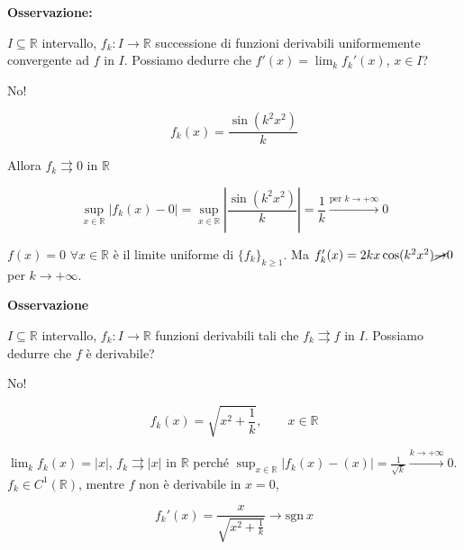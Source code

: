 \begin{dembar}
	
\end{dembar}


\textbf{Osservazione:}


$I \subseteq \mathbb{R}$ intervallo, $f_k: I \rightarrow \mathbb{R}$ successione di funzioni derivabili uniformemente convergente ad $f$ in $I$. Possiamo dedurre che $f'(x) = \lim_{k}f_k'(x)$, $x \in I$?

No!

$$f_k(x)=\frac{\sin(k^2x^2)}{k}$$ 

Allora $f_k \rightrightarrows 0$ in $\mathbb{R}$ 

$$\sup_{x \in \mathbb{R}}|f_k(x)-0|= \sup_{x \in \mathbb{R}}|\frac{\sin(k^2x^2)}{k}|= \frac{1}{k}\xrightarrow{\text{per } k \to +\infty} 0$$

$f(x)=0 \,\, \forall x \in \mathbb{R}$ è il limite uniforme di $\{f_k\}_{k\geq 1}$. Ma $f_k'(x)=2kx\cos(k^2x^2)\cancel{\rightarrow} 0$ per $k \rightarrow +\infty$.


\textbf{Osservazione}

$I \subseteq \mathbb{R}$ intervallo, $f_k: I \rightarrow \mathbb{R}$ funzioni derivabili tali che $f_k \rightrightarrows f$ in $I$. Possiamo dedurre che $f$ è derivabile?

No!

$$f_k(x)= \sqrt{x^2+\frac{1}{k}}, \qquad x \in \mathbb{R}$$

\segnaposto %

$\lim_{k} f_k(x)=|x|$, $f_k \rightrightarrows |x|$ in $\mathbb{R}$ perché $\sup_{x\in \mathbb{R}}|f_k(x)-(x)|= \frac{1}{\sqrt{k}}\xrightarrow{k \rightarrow +\infty}0$. $f_k \in C^1(\mathbb{R})$, mentre $f$ non è derivabile in $x =0$, 

$$f_k' (x) = \frac{x}{\sqrt{x^2+\frac{1}{k}}} \rightarrow \mathrm{sgn} \ x$$
 
